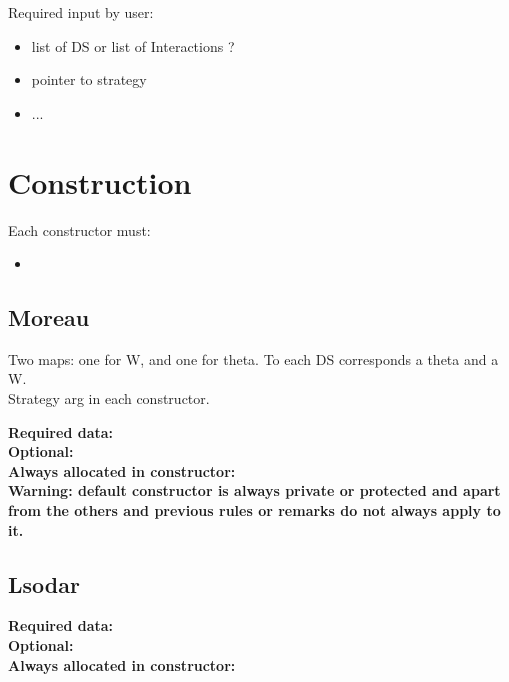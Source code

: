 \documentclass[10pt]{article}
\begin{document}
Required input by user: \\
\begin{itemize}
\item list of DS or list of Interactions ? 
\item pointer to strategy
\item ...
\end{itemize}

\section{Construction}

Each constructor must:

\begin{itemize}
\item
\end{itemize}

\subsection{Moreau}

Two maps: one for W, and one for theta. To each DS corresponds a theta and a W. \\
Strategy arg in each constructor.

\bf{Required data:}\\

\bf{Optional:}\\

\bf{Always allocated in constructor:} \\

Warning: default constructor is always private or protected and apart from the others and previous rules or remarks do not always apply to it. 

\subsection{Lsodar}

\bf{Required data:}\\

\bf{Optional:}\\

\bf{Always allocated in constructor:} \\
\end{document}
